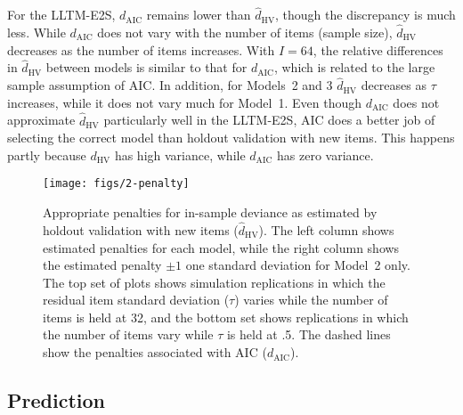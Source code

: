 For the LLTM-E2S, $d_\mathrm{AIC}$ remains lower than $\hat d_{\mathrm{HV}}$, though the discrepancy is much less. While $d_\mathrm{AIC}$ does not vary with the number of items (sample size), $\hat d_{\mathrm{HV}}$ decreases as the number of items increases. With $I=64$, the relative differences in $\hat d_{\mathrm{HV}}$ between models is similar to that for $d_\mathrm{AIC}$, which is related to the large sample assumption of AIC. In addition, for Models~2 and 3 $\hat d_{\mathrm{HV}}$ decreases as $\tau$ increases, while it does not vary much for Model~1. Even though $d_\mathrm{AIC}$ does not approximate $\hat d_{\mathrm{HV}}$ particularly well in the LLTM-E2S, AIC does a better job of selecting the correct model than holdout validation with new items. This happens partly because $d_{\mathrm{HV}}$ has high variance, while $d_\mathrm{AIC}$ has zero variance.


\begin{figure}
	\centering
	\texttt{[image: figs/2-penalty]}
	\caption{Appropriate penalties for in-sample deviance as estimated by holdout validation with new items ($\hat d_{\mathrm{HV}}$). The left column shows estimated penalties for each model, while the right column shows the estimated penalty $\pm 1$ one standard deviation for Model~2 only. The top set of plots shows simulation replications in which the residual item standard deviation ($\tau$) varies while the number of items is held at 32, and the bottom set shows replications in which the number of items vary while $\tau$ is held at .5.
	The dashed lines show the penalties associated with AIC ($d_\mathrm{AIC}$).}
	\label{fig:2-penalty}
\end{figure}


\subsection{Prediction}

